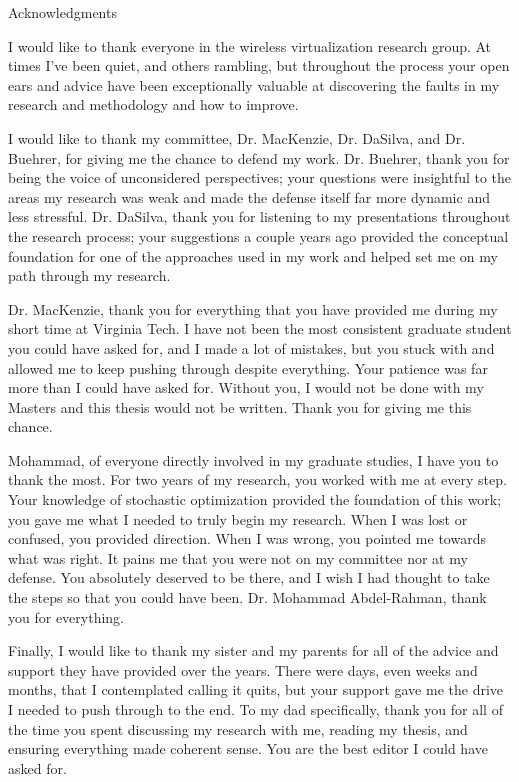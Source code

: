 \documentclass[12pt,dvipsnames]{report}
\begin{document}
\pagebreak

\begin{center}

{\large Acknowledgments}

\end{center}

I would like to thank everyone in the wireless virtualization research group.  At times I've been quiet, and others rambling, but throughout the process your open ears and advice have been exceptionally valuable at discovering the faults in my research and methodology and how to improve.

I would like to thank my committee, Dr. MacKenzie, Dr. DaSilva, and Dr. Buehrer, for giving me the chance to defend my work.  Dr. Buehrer, thank you for being the voice of unconsidered perspectives; your questions were insightful to the areas my research was weak and made the defense itself far more dynamic and less stressful.  Dr. DaSilva, thank you for listening to my presentations throughout the research process; your suggestions a couple years ago provided the conceptual foundation for one of the approaches used in my work and helped set me on my path through my research.

Dr. MacKenzie, thank you for everything that you have provided me during my short time at Virginia Tech.  I have not been the most consistent graduate student you could have asked for, and I made a lot of mistakes, but you stuck with and allowed me to keep pushing through despite everything.  Your patience was far more than I could have asked for.  Without you, I would not be done with my Masters and this thesis would not be written.  Thank you for giving me this chance.

Mohammad, of everyone directly involved in my graduate studies, I have you to thank the most.  For two years of my research, you worked with me at every step.  Your knowledge of stochastic optimization provided the foundation of this work; you gave me what I needed to truly begin my research.  When I was lost or confused, you provided direction.  When I was wrong, you pointed me towards what was right.  It pains me that you were not on my committee nor at my defense.  You absolutely deserved to be there, and I wish I had thought to take the steps so that you could have been.  Dr. Mohammad Abdel-Rahman, thank you for everything.

Finally, I would like to thank my sister and my parents for all of the advice and support they have provided over the years.  There were days, even weeks and months, that I contemplated calling it quits, but your support gave me the drive I needed to push through to the end.  To my dad specifically, thank you for all of the time you spent discussing my research with me, reading my thesis, and ensuring everything made coherent sense.  You are the best editor I could have asked for.
\end{document}
